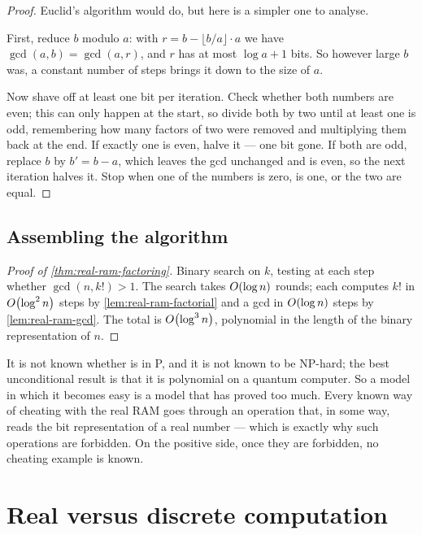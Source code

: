 \begin{proof}
Euclid's algorithm would do, but here is a simpler one to analyse.

First, reduce $b$ modulo $a$: with $r = b - \lfloor b/a \rfloor \cdot a$ we have
$\gcd(a,b) = \gcd(a,r)$, and $r$ has at most $\log a + 1$ bits. So however large
$b$ was, a constant number of steps brings it down to the size of $a$.

Now shave off at least one bit per iteration. Check whether both numbers are
even; this can only happen at the start, so divide both by two until at least
one is odd, remembering how many factors of two were removed and multiplying
them back at the end. If exactly one is even, halve it --- one bit gone. If both
are odd, replace $b$ by $b' = b-a$, which leaves the gcd unchanged and is even,
so the next iteration halves it. Stop when one of the numbers is zero, is one,
or the two are equal.
\end{proof}

\subsection{Assembling the algorithm}

\begin{proof}[Proof of \cref{thm:real-ram-factoring}]
Binary search on $k$, testing at each step whether $\gcd(n, k!) > 1$. The
search takes $O\!\left(\log n\right)$ rounds; each computes $k!$ in
$O\!\left(\log^2 n\right)$ steps by \cref{lem:real-ram-factorial} and a gcd in
$O\!\left(\log n\right)$ steps by \cref{lem:real-ram-gcd}. The total is
$O\!\left(\log^3 n\right)$, polynomial in the length of the binary representation of
$n$.
\end{proof}

\begin{intuition}
It is not known whether  is in P, and it is not known to be
NP-hard; the best unconditional result is that it is polynomial on a quantum
computer. So a model in which it becomes easy is a model that has proved too
much. Every known way of cheating with the real RAM goes through an operation
that, in some way, reads the bit representation of a real number --- which is
exactly why such operations are forbidden. On the positive side, once they are
forbidden, no cheating example is known.
\end{intuition}

\section{Real versus discrete computation}
\label{sec:posslp}

